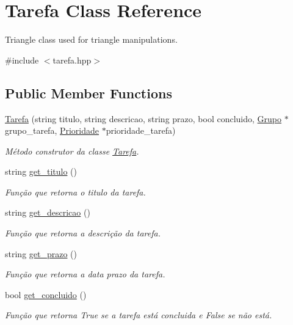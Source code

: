 \hypertarget{classTarefa}{}\section{Tarefa Class Reference}
\label{classTarefa}


Triangle class used for triangle manipulations.  




{\ttfamily \#include $<$tarefa.\+hpp$>$}

\subsection*{Public Member Functions}
\begin{DoxyCompactItemize}
\item 
\hyperlink{classTarefa_a6567c607df9f7dca0d23f82d9e20c7fa}{Tarefa} (string titulo, string descricao, string prazo, bool concluido, \hyperlink{classGrupo}{Grupo} $\ast$grupo\+\_\+tarefa, \hyperlink{classPrioridade}{Prioridade} $\ast$prioridade\+\_\+tarefa)
\begin{DoxyCompactList}\small\item\em Método construtor da classe \hyperlink{classTarefa}{Tarefa}. \end{DoxyCompactList}\item 
string \hyperlink{classTarefa_a76abc4ef4d7c2cd5ab2e9530700f69aa}{get\+\_\+titulo} ()
\begin{DoxyCompactList}\small\item\em Função que retorna o titulo da tarefa. \end{DoxyCompactList}\item 
string \hyperlink{classTarefa_aa2bb888f5bc93272e6e0aa5c0f3879fa}{get\+\_\+descricao} ()
\begin{DoxyCompactList}\small\item\em Função que retorna a descrição da tarefa. \end{DoxyCompactList}\item 
string \hyperlink{classTarefa_a076d7bd66a444b26cb8d52ff34bbe39e}{get\+\_\+prazo} ()
\begin{DoxyCompactList}\small\item\em Função que retorna a data prazo da tarefa. \end{DoxyCompactList}\item 
bool \hyperlink{classTarefa_ae6a61ad035a0685f7b201c4a726413da}{get\+\_\+concluido} ()
\begin{DoxyCompactList}\small\item\em Função que retorna True se a tarefa está concluida e False se não está. \end{DoxyCompactList}\item 

\end{DoxyCompactItemize}
